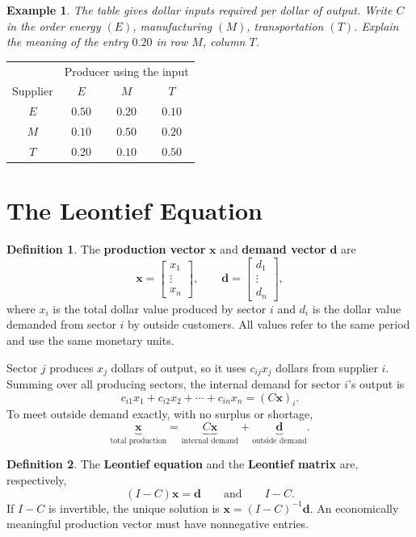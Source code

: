 \documentclass{article}
\theoremstyle{plain}
\newtheorem{example}{Example}[section]
\theoremstyle{definition}
\newtheorem{definition}{Definition}[section]
\theoremstyle{remark}
\renewcommand{\vec}[1]{\mathbf{#1}}
\newcommand{\work}{\par\vfill}
\begin{document}
\work

\newpage
\begin{example}\label{ex:table}
The table gives dollar inputs required per dollar of output. Write $C$ in the order energy $(E)$, manufacturing $(M)$, transportation $(T)$. Explain the meaning of the entry $0.20$ in row $M$, column $T$.
\end{example}
\begin{center}
\renewcommand{\arraystretch}{1.2}
\begin{tabular}{c|ccc}
 &\multicolumn{3}{c}{Producer using the input}\\
Supplier & $E$ & $M$ & $T$\\\hline
$E$ & $0.50$ & $0.20$ & $0.10$\\
$M$ & $0.10$ & $0.50$ & $0.20$\\
$T$ & $0.20$ & $0.10$ & $0.50$
\end{tabular}
\end{center}

\work

\newpage
\section{The Leontief Equation}
\begin{definition}
The \textbf{production vector} $\vec{x}$ and \textbf{demand vector} $\vec{d}$ are
\[
\vec{x}=\begin{bmatrix}x_1\\ \vdots\\x_n\end{bmatrix},\qquad
\vec{d}=\begin{bmatrix}d_1\\ \vdots\\d_n\end{bmatrix},
\]
where $x_i$ is the total dollar value produced by sector $i$ and $d_i$ is the dollar value demanded from sector $i$ by outside customers. All values refer to the same period and use the same monetary units.
\end{definition}

Sector $j$ produces $x_j$ dollars of output, so it uses $c_{ij}x_j$ dollars from supplier $i$. Summing over all producing sectors, the internal demand for sector $i$'s output is
\[
c_{i1}x_1+c_{i2}x_2+\cdots+c_{in}x_n=(C\vec{x})_i.
\]
To meet outside demand exactly, with no surplus or shortage,
\[
\underbrace{\vec{x}}_{\text{total production}}
=\underbrace{C\vec{x}}_{\text{internal demand}}
+\underbrace{\vec{d}}_{\text{outside demand}}.
\]
\begin{definition}
The \textbf{Leontief equation} and the \textbf{Leontief matrix} are, respectively,
\[
\boxed{(I-C)\vec{x}=\vec{d}}\qquad\text{and}\qquad I-C.
\]
If $I-C$ is invertible, the unique solution is $\boxed{\vec{x}=(I-C)^{-1}\vec{d}}$.
An economically meaningful production vector must have nonnegative entries.
\end{definition}
\end{document}
